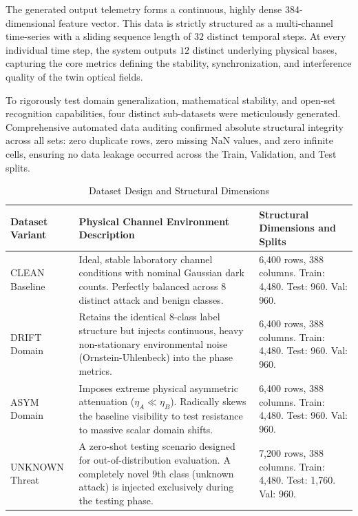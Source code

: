 \documentclass[10pt, journal, letterpaper, twocolumn]{IEEEtran}
\begin{document}
The generated output telemetry forms a continuous, highly dense 384-dimensional feature vector. This data is strictly structured as a multi-channel time-series with a sliding sequence length of $32$ distinct temporal steps. At every individual time step, the system outputs $12$ distinct underlying physical bases, capturing the core metrics defining the stability, synchronization, and interference quality of the twin optical fields.

To rigorously test domain generalization, mathematical stability, and open-set recognition capabilities, four distinct sub-datasets were meticulously generated. Comprehensive automated data auditing confirmed absolute structural integrity across all sets: zero duplicate rows, zero missing NaN values, and zero infinite cells, ensuring no data leakage occurred across the Train, Validation, and Test splits.

\begin{table}[htbp]
\centering
\caption{Dataset Design and Structural Dimensions}
\begin{tabular}{@{}lp{9cm}l@{}}
\toprule
\textbf{Dataset Variant} & \textbf{Physical Channel Environment Description} & \textbf{Structural Dimensions and Splits} \\ \midrule
CLEAN Baseline & Ideal, stable laboratory channel conditions with nominal Gaussian dark counts. Perfectly balanced across 8 distinct attack and benign classes. & 6,400 rows, 388 columns. Train: 4,480. Test: 960. Val: 960. \\
DRIFT Domain & Retains the identical 8-class label structure but injects continuous, heavy non-stationary environmental noise (Ornstein-Uhlenbeck) into the phase metrics. & 6,400 rows, 388 columns. Train: 4,480. Test: 960. Val: 960. \\
ASYM Domain & Imposes extreme physical asymmetric attenuation ($\eta_A \ll \eta_B$). Radically skews the baseline visibility to test resistance to massive scalar domain shifts. & 6,400 rows, 388 columns. Train: 4,480. Test: 960. Val: 960. \\
UNKNOWN Threat & A zero-shot testing scenario designed for out-of-distribution evaluation. A completely novel 9th class (unknown attack) is injected exclusively during the testing phase. & 7,200 rows, 388 columns. Train: 4,480. Test: 1,760. Val: 960. \\ \bottomrule
\end{tabular}
\end{table}
\end{document}
